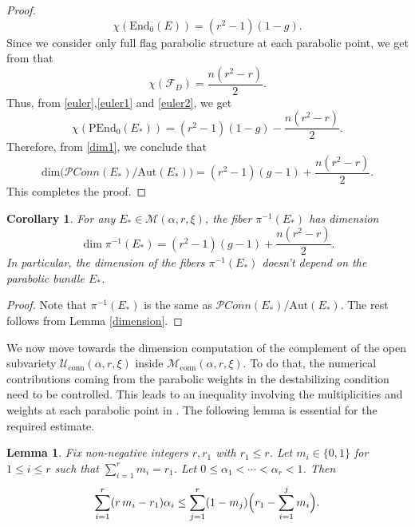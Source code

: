 \documentclass[11pt, reqno]{amsart}
\numberwithin{equation}{section}
\newtheorem{corollary}[theorem]{Corollary}
\newtheorem{lemma}[theorem]{Lemma}
\theoremstyle{definition}
\begin{document}
\begin{proof}
\begin{equation}
      \chi(\mathrm{End}_0(E)) = (r^2-1)(1-g).
  \end{equation}
  Since we consider only full flag parabolic structure at each parabolic point, we get from \cite[Lemma $2.4$]{BH95} that
  \begin{equation}\label{euler2}
      \chi(\mathcal{F}_D) = \frac{n(r^2-r)}{2}.
  \end{equation}
  Thus, from \eqref{euler},\eqref{euler1} and \eqref{euler2}, we get
  \[
  \chi(\mathrm{PEnd}_0(E_*)) = (r^2-1)(1-g) - \frac{n(r^2-r)}{2}.
  \]
  Therefore, from \eqref{dim1}, we conclude that
  \begin{equation}
      \mathrm{dim} \big(\mathcal{P}\textit{Conn}(E_*)/\mathrm{Aut}(E_*)\big) = (r^2-1)(g-1) + \frac{n(r^2-r)}{2}.
  \end{equation}
This completes the proof.	
\end{proof}

\begin{corollary}\label{dimension1}
    For any $E_* \in \mathcal{M}(\alpha,r,\xi)$, the fiber $\pi^{-1}(E_*)$ has dimension
    \[
    \dim \pi^{-1}(E_*) = (r^2-1)(g-1) + \frac{n(r^2-r)}{2}.
    \]
      In particular, the dimension of the fibers $\pi^{-1}(E_*)$ doesn't depend on the parabolic bundle $E_*$.
\end{corollary}
\begin{proof}
    Note that $\pi^{-1}(E_*)$ is the same as $\mathcal{P}\textit{Conn}(E_*)/\mathrm{Aut}(E_*)$. The rest follows from Lemma \ref{dimension}.
\end{proof}


We now move towards the dimension computation of the complement of the open subvariety $\mathcal{U}_{\mathrm{conn}}(\alpha, r, \xi) $ inside $\mathcal{M}_{\mathrm{conn}}(\alpha, r, \xi)$. To do that, the numerical contributions coming from the parabolic weights in the destabilizing condition need to be controlled. This leads to an inequality involving the multiplicities and weights at each parabolic point in . The following lemma is essential for the required estimate.

\begin{lemma}\label{key_lemma}
Fix non-negative integers $r,r_1$ with $r_1 \leq r$. Let $m_i \in \{0,1\}$ for $1 \leq i \leq r$ such that $\sum\limits_{i=1}^r m_i=r_1$. Let $0\le \alpha_1<\cdots<\alpha_r<1$. Then
\[
\sum\limits_{i=1}^r (r\,m_i-r_1)\alpha_i
\leq
\sum_{j=1}^{r}(1-m_j)\Bigl(r_1-\sum_{i=1}^{j}m_i\Bigr).
\]
\end{lemma}
\end{document}
